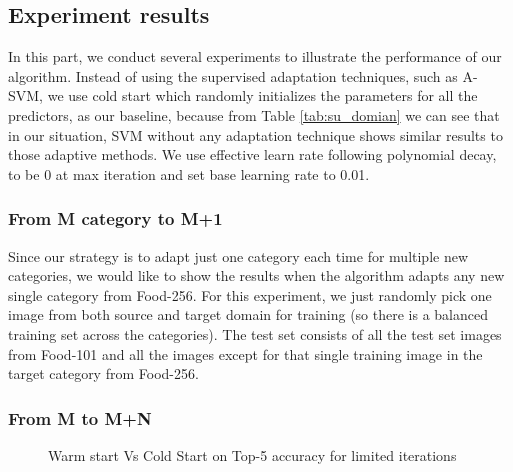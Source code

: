 \subsection{Experiment results}
In this part, we conduct several experiments to illustrate the performance of our algorithm. Instead of using the supervised adaptation techniques, such as A-SVM, we use cold start which randomly initializes the parameters for all the predictors, as our baseline, because from Table \ref{tab:su_domian} we can see that in our situation, SVM without any adaptation technique shows similar results to those adaptive methods. We use effective learn rate following polynomial decay, to be 0 at max iteration and set base learning rate to 0.01.

\subsubsection{From M category to M+1}
Since our strategy is to adapt just one category each time for multiple new categories, we would like to show the results when the algorithm adapts any new single category from Food-256. For this experiment, we just randomly pick one image from both source and target domain for training (so there is a balanced training set across the categories). The test set consists of all the test set images from Food-101 and all the images except for that single training image in the target category from Food-256.

\subsubsection{From M to M+N}

\begin{figure}
  \centering
  \centering
\caption{Warm start Vs Cold Start on Top-5 accuracy for limited iterations}
\end{figure}
